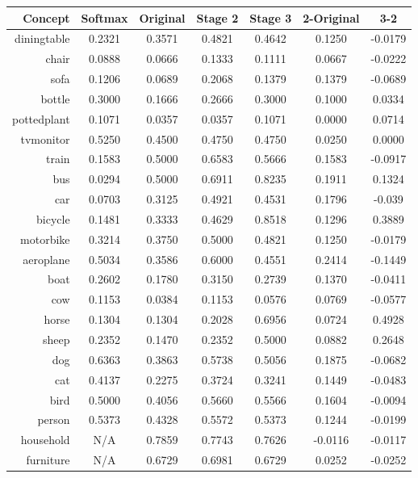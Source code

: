 \documentclass[11pt,a4paper]{article}
\begin{document}
\begin{table}[htbp]
\centering
\begin{tabular}{r|c|c|c|c|c|c}
Concept & Softmax & Original & Stage 2 & Stage 3 & 2-Original & 3-2\\\hline
diningtable   & 0.2321 & 0.3571 & 0.4821 & 0.4642 & 0.1250 & -0.0179\\
chair         & 0.0888 & 0.0666 & 0.1333 & 0.1111 & 0.0667 & -0.0222\\
sofa          & 0.1206 & 0.0689 & 0.2068 & 0.1379 & 0.1379 & -0.0689\\
bottle        & 0.3000 & 0.1666 & 0.2666 & 0.3000 & 0.1000 & 0.0334\\
pottedplant   & 0.1071 & 0.0357 & 0.0357 & 0.1071 & 0.0000 & 0.0714\\
tvmonitor     & 0.5250 & 0.4500 & 0.4750 & 0.4750 & 0.0250 & 0.0000\\
train         & 0.1583 & 0.5000 & 0.6583 & 0.5666 & 0.1583 & -0.0917\\
bus           & 0.0294 & 0.5000 & 0.6911 & 0.8235 & 0.1911 & 0.1324\\
car           & 0.0703 & 0.3125 & 0.4921 & 0.4531 & 0.1796 & -0.039\\
bicycle       & 0.1481 & 0.3333 & 0.4629 & 0.8518 & 0.1296 & 0.3889\\
motorbike     & 0.3214 & 0.3750 & 0.5000 & 0.4821 & 0.1250 & -0.0179\\
aeroplane     & 0.5034 & 0.3586 & 0.6000 & 0.4551 & 0.2414 & -0.1449\\
boat          & 0.2602 & 0.1780 & 0.3150 & 0.2739 & 0.1370 & -0.0411\\
cow           & 0.1153 & 0.0384 & 0.1153 & 0.0576 & 0.0769 & -0.0577\\
horse         & 0.1304 & 0.1304 & 0.2028 & 0.6956 & 0.0724 & 0.4928\\
sheep         & 0.2352 & 0.1470 & 0.2352 & 0.5000 & 0.0882 & 0.2648\\
dog           & 0.6363 & 0.3863 & 0.5738 & 0.5056 & 0.1875 & -0.0682\\
cat           & 0.4137 & 0.2275 & 0.3724 & 0.3241 & 0.1449 & -0.0483\\
bird          & 0.5000 & 0.4056 & 0.5660 & 0.5566 & 0.1604 & -0.0094\\
person        & 0.5373 & 0.4328 & 0.5572 & 0.5373 & 0.1244 & -0.0199\\\hline
household     & N/A    & 0.7859 & 0.7743 & 0.7626 & -0.0116 & -0.0117\\
furniture     & N/A    & 0.6729 & 0.6981 & 0.6729 & 0.0252 & -0.0252\\

\end{tabular}
\end{table}
\end{document}
